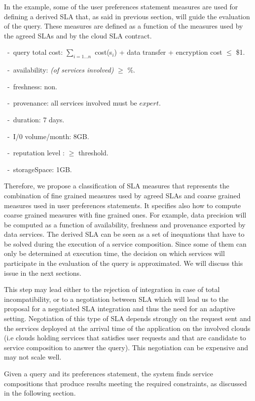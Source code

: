 In the example, some of the user preferences statement measures are used for defining a derived SLA that, as said in previous section, will guide the evaluation of the query. 
These measures are defined as a function of the measures used by the agreed SLAs and by the cloud SLA contract.
\begin{trivlist}\sf\footnotesize
 \item[~-~query total cost:] $\sum_{i = 1\dots n}$ cost(s$_i$) + data transfer + encryption cost $\leq$ \$1.
 \item[~-~availability:] {\em (of services involved)} $\geq$ {$\%$}.
 \item[~-~freshness:] non.
 \item[~-~provenance:] all services involved must be $expert$.
 \item[~-~duration:] 7 days.
 \item[~-~I/0 volume/month:] 8GB.
 \item[~-~reputation level :] $\geq$ threshold.
 \item[~-~storageSpace:] 1GB.
 \end{trivlist} 
 
Therefore, we propose a classification of SLA measures that represents the combination of fine grained measures used by agreed SLAs and coarse grained measures used in user preferences statements. 
It specifies also how to compute coarse grained measures with fine grained ones. 
For example, data precision will be computed as a function of availability, freshness and provenance exported by data services. The derived SLA can be seen as a set of inequations that have to be solved during the execution of a service composition. Since some of them can only be determined at execution time, the decision on which services will participate in the evaluation of the query is approximated. We will discuss this issue in the next sections.

This step may lead either to the rejection of integration in case of total incompatibility, or to a negotiation between SLA which will lead us to the proposal for a negotiated SLA integration and thus the need for an adaptive setting.
Negotiation of this type of SLA depends strongly on the request sent and the services deployed at the arrival time of the application on the involved  clouds (i.e clouds holding services that satisfies user requests and that are candidate to service composition to answer the query). This negotiation can be expensive and may not scale well.
 
Given a query and its preferences statement, the system  finds  service compositions that produce results   meeting the required constraints, as discussed in the following section.

